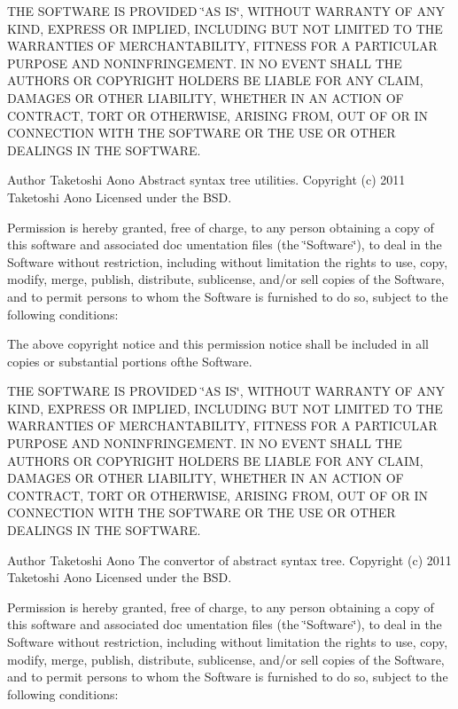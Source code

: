 THE SOFTWARE IS PROVIDED \char`\"{}AS IS\char`\"{}, WITHOUT WARRANTY OF ANY KIND, EXPRESS OR IMPLIED, INCLUDING BUT NOT LIMITED TO THE WARRANTIES OF MERCHANTABILITY, FITNESS FOR A PARTICULAR PURPOSE AND NONINFRINGEMENT. IN NO EVENT SHALL THE AUTHORS OR COPYRIGHT HOLDERS BE LIABLE FOR ANY CLAIM, DAMAGES OR OTHER LIABILITY, WHETHER IN AN ACTION OF CONTRACT, TORT OR OTHERWISE, ARISING FROM, OUT OF OR IN CONNECTION WITH THE SOFTWARE OR THE USE OR OTHER DEALINGS IN THE SOFTWARE.

\begin{DoxyAuthor}{Author}
Taketoshi Aono  Abstract syntax tree utilities.  Copyright (c) 2011 Taketoshi Aono Licensed under the BSD.
\end{DoxyAuthor}
Permission is hereby granted, free of charge, to any person obtaining a copy of this software and associated doc umentation files (the \char`\"{}Software\char`\"{}), to deal in the Software without restriction, including without limitation the rights to use, copy, modify, merge, publish, distribute, sublicense, and/or sell copies of the Software, and to permit persons to whom the Software is furnished to do so, subject to the following conditions:

The above copyright notice and this permission notice shall be included in all copies or substantial portions ofthe Software.

THE SOFTWARE IS PROVIDED \char`\"{}AS IS\char`\"{}, WITHOUT WARRANTY OF ANY KIND, EXPRESS OR IMPLIED, INCLUDING BUT NOT LIMITED TO THE WARRANTIES OF MERCHANTABILITY, FITNESS FOR A PARTICULAR PURPOSE AND NONINFRINGEMENT. IN NO EVENT SHALL THE AUTHORS OR COPYRIGHT HOLDERS BE LIABLE FOR ANY CLAIM, DAMAGES OR OTHER LIABILITY, WHETHER IN AN ACTION OF CONTRACT, TORT OR OTHERWISE, ARISING FROM, OUT OF OR IN CONNECTION WITH THE SOFTWARE OR THE USE OR OTHER DEALINGS IN THE SOFTWARE.

\begin{DoxyAuthor}{Author}
Taketoshi Aono  The convertor of abstract syntax tree.  Copyright (c) 2011 Taketoshi Aono Licensed under the BSD.
\end{DoxyAuthor}
Permission is hereby granted, free of charge, to any person obtaining a copy of this software and associated doc umentation files (the \char`\"{}Software\char`\"{}), to deal in the Software without restriction, including without limitation the rights to use, copy, modify, merge, publish, distribute, sublicense, and/or sell copies of the Software, and to permit persons to whom the Software is furnished to do so, subject to the following conditions:

